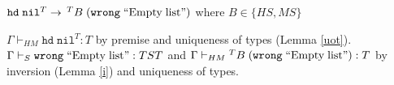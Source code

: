 \begin{case}
$\mathtt{hd}\;\mathtt{nil}^{T}\rightarrow\,^{T}B\;(\mathtt{wrong}\;\mathrm{``Empty\;list"})$ where $B\in\lbrace HS,MS\rbrace$

$\Gamma\vdash_{HM}\mathtt{hd}\;\mathtt{nil}^{T}:T$ by premise and uniqueness of types (Lemma \ref{uot}).  $\Gamma\vdash_{S}\mathtt{wrong}\;\mathrm{``Empty\;list"}:TST$ and $\Gamma\vdash_{HM}{^{T}B}\;(\mathtt{wrong}\;\mathrm{``Empty\;list"}):T$ by inversion (Lemma \ref{i}) and uniqueness of types.
\end{case}